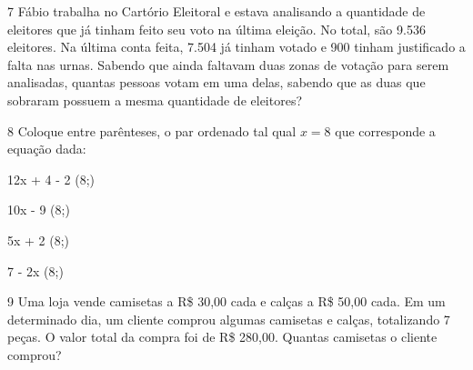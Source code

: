 \num{7} Fábio trabalha no Cartório Eleitoral e estava analisando a quantidade
de eleitores que já tinham feito seu voto na última eleição. No total,
são 9.536 eleitores. Na última conta feita, 7.504 já tinham votado e 900
tinham justificado a falta nas urnas. Sabendo que ainda faltavam duas
zonas de votação para serem analisadas, quantas pessoas votam em uma
delas, sabendo que as duas que sobraram possuem a mesma quantidade de
eleitores?


\num{8} Coloque entre parênteses, o par ordenado tal qual $x = 8$ que
corresponde a equação dada:

\begin{escolha}
\item 12x + 4 - 2 (8;) 
\item 10x - 9 (8;) 
\item 5x + 2 (8;) 
\item 7 - 2x (8;) 
\end{escolha}

\num{9} Uma loja vende camisetas a R\$ 30,00 cada e calças a R\$ 50,00 cada.
Em um determinado dia, um cliente comprou algumas camisetas e calças,
totalizando 7 peças. O valor total da compra foi de R\$ 280,00. Quantas
camisetas o cliente comprou?


